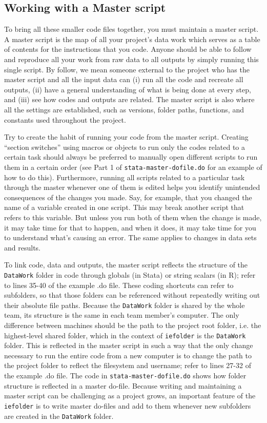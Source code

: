 \subsection{Working with a Master script}
To bring all these smaller code files together, you must maintain a master script.
A master script is the map of all your project's data work
which serves as a table of contents for the instructions that you code.
Anyone should be able to follow and reproduce all your work from
raw data to all outputs by simply running this single script.
By follow, we mean someone external to the project who has the master script and all the input data can
(i) run all the code and recreate all outputs,
(ii) have a general understanding of what is being done at every step, and
(iii) see how codes and outputs are related.
The master script is also where all the settings are established,
such as versions, folder paths, functions, and constants used throughout the project.

Try to create the habit of running your code from the master script.
Creating ``section switches'' using macros or objects to run only the codes related to a certain task
should always be preferred to manually open different scripts to run them in a certain order
(see Part 1 of \texttt{stata-master-dofile.do} for an example of how to do this).
Furthermore, running all scripts related to a particular task through the master whenever one of them is edited
helps you identify unintended consequences of the changes you made.
Say, for example, that you changed the name of a variable created in one script.
This may break another script that refers to this variable.
But unless you run both of them when the change is made, it may take time for that to happen,
and when it does, it may take time for you to understand what's causing an error.
The same applies to changes in data sets and results.

To link code, data and outputs, 
the master script reflects the structure of the \texttt{DataWork} folder in code
through globals (in Stata) or string scalars (in R); 
refer to lines 35-40 of the example .do file. 
These coding shortcuts can refer to subfolders,
so that those folders can be referenced without repeatedly writing out their absolute file paths.
Because the \texttt{DataWork} folder is shared by the whole team,
its structure is the same in each team member's computer.
The only difference between machines should be
the path to the project root folder, i.e. the highest-level shared folder, 
which in the context of \texttt{iefolder} is the \texttt{DataWork} folder.
This is reflected in the master script in such a way that
the only change necessary to run the entire code from a new computer
is to change the path to the project folder to reflect the filesystem and username; 
refer to lines 27-32 of the example .do file.
The code in \texttt{stata-master-dofile.do} shows how folder structure is reflected in a master do-file.
Because writing and maintaining a master script can be challenging as a project grows,
an important feature of the \texttt{iefolder} is to write master do-files
and add to them whenever new subfolders are created in the \texttt{DataWork} folder.

